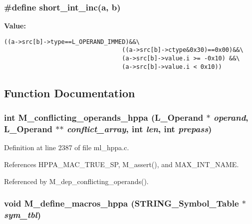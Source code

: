 \subsubsection{\setlength{\rightskip}{0pt plus 5cm}\#define short\_\-int\_\-inc(a, b)}\label{ml__hppa_8c_beca719e984ec0dc73106055269cd986}


\textbf{Value:}

\begin{Code}\begin{verbatim}((a->src[b]->type==L_OPERAND_IMMED)&&\
                                 ((a->src[b]->ctype&0x30)==0x00)&&\
                                 (a->src[b]->value.i >= -0x10) &&\
                                 (a->src[b]->value.i < 0x10))
\end{verbatim}\end{Code}


\subsection{Function Documentation}
\subsubsection{\setlength{\rightskip}{0pt plus 5cm}int M\_\-conflicting\_\-operands\_\-hppa (L\_\-Operand $\ast$ {\em operand}, L\_\-Operand $\ast$$\ast$ {\em conflict\_\-array}, int {\em len}, int {\em prepass})}\label{ml__hppa_8c_859e41c807ea451447492d5c5ea0ad20}




Definition at line 2387 of file ml\_\-hppa.c.

References HPPA\_\-MAC\_\-TRUE\_\-SP, M\_\-assert(), and MAX\_\-INT\_\-NAME.

Referenced by M\_\-dep\_\-conflicting\_\-operands().
\subsubsection{\setlength{\rightskip}{0pt plus 5cm}void M\_\-define\_\-macros\_\-hppa (\bf{STRING\_\-Symbol\_\-Table} $\ast$ {\em sym\_\-tbl})}\label{ml__hppa_8c_3c7cde3308152f998e523078246208c6}





